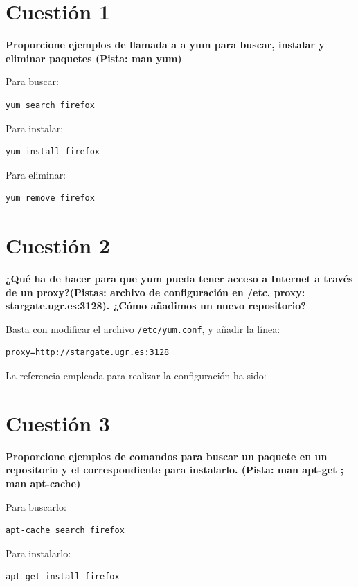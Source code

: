 \documentclass[a4paper,11pt]{article}
\newenvironment{answer}{%
\begin{list}{}{%
}%
\item[]}{\end{list}}
\newcommand{\imagent}[4]{
  \begin{figure}
    \begin{center}
    \texttt{[image: \#1]}
    \end{center}
    \caption{#3}
    \label{#4}
  \end{figure}
}
\newcommand{\imagen}[4]{
  \begin{minipage}{\linewidth}
    \centering
    \texttt{[image: \#1]}
    \captionof{figure}{#2}
    \label{#3}
  \end{minipage} 
}
\begin{document}
\newpage
\tableofcontents
\newpage

\section{Cuestión 1}
\textbf{Proporcione ejemplos de llamada a a yum para buscar, instalar y eliminar paquetes (Pista: man yum)}
\begin{answer}
  Para buscar:
  \begin{lstlisting}[style=BashInputStyle]
  yum search firefox
  \end{lstlisting}
  Para instalar:
  \begin{lstlisting}[style=BashInputStyle]
  yum install firefox
  \end{lstlisting}
  Para eliminar:
  \begin{lstlisting}[style=BashInputStyle]
  yum remove firefox
  \end{lstlisting}
\end{answer}

\section{Cuestión 2}
\textbf{¿Qué ha de hacer para que yum pueda tener acceso a Internet a través de un proxy?(Pistas: archivo de configuración
en /etc, proxy: stargate.ugr.es:3128). ¿Cómo añadimos un nuevo repositorio?}
\begin{answer}
  Basta con modificar el archivo \texttt{/etc/yum.conf}, y añadir la línea:
  \begin{lstlisting}[style=BashInputStyle]
  proxy=http://stargate.ugr.es:3128
  \end{lstlisting}
  
  La referencia empleada para realizar la configuración ha sido: \cite{ej2}
\end{answer}

\section{Cuestión 3}
\textbf{Proporcione ejemplos de comandos para buscar un paquete en un repositorio y el correspondiente para instalarlo. 
(Pista: man apt-get ; man apt-cache)}
\begin{answer}
  Para buscarlo:
  \begin{lstlisting}[style=BashInputStyle]
  apt-cache search firefox
  \end{lstlisting}
  Para instalarlo:
  \begin{lstlisting}[style=BashInputStyle]
  apt-get install firefox
  \end{lstlisting}
\end{answer}
\end{document}
